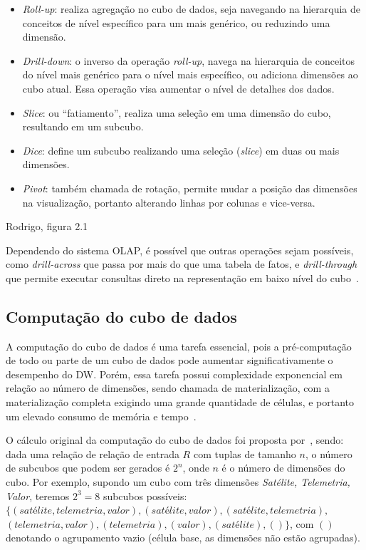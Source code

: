 \begin{itemize}
	\item \textit{Roll-up}: realiza agregação no cubo de dados, seja navegando na hierarquia de conceitos de nível específico para um mais genérico, ou reduzindo uma dimensão.
	\item \textit{Drill-down}: o inverso da operação \textit{roll-up}, navega na hierarquia de conceitos do nível mais genérico para o nível mais específico, ou adiciona dimensões ao cubo atual.
Essa operação visa aumentar o nível de detalhes dos dados.
	\item \textit{Slice}: ou ``fatiamento'', realiza uma seleção em uma dimensão do cubo, resultando em um subcubo.
	\item \textit{Dice}: define um subcubo realizando uma seleção (\textit{slice}) em duas ou mais dimensões.
	\item \textit{Pivot}: também chamada de rotação, permite mudar a posição das dimensões na visualização, portanto alterando linhas por colunas e vice-versa.
\end{itemize}

{\color{red} Rodrigo, figura 2.1}

Dependendo do sistema OLAP, é possível que outras operações sejam possíveis, como \textit{drill-across} que passa por mais do que uma tabela de fatos, e \textit{drill-through} que permite executar consultas direto na representação em baixo nível do cubo~\cite{hanDataMiningConcepts2011}.

\subsection{Computação do cubo de dados}\label{ch:fun:cube:comp}

A computação do cubo de dados é uma tarefa essencial, pois a pré-computação de todo ou parte de um cubo de dados pode aumentar significativamente o desempenho do DW.
Porém, essa tarefa possui complexidade exponencial em relação ao número de dimensões, sendo chamada de materialização, com a materialização completa exigindo uma grande quantidade de células, e portanto um elevado consumo de memória e tempo~\cite{hanDataMiningConcepts2011}.

O cálculo original da computação do cubo de dados foi proposta por~\cite{grayDataCubeRelational1996}, sendo: dada uma relação de relação de entrada $R$ com tuplas de tamanho $n$, o número de subcubos que podem ser gerados é $2^n$, onde $n$ é o número de dimensões do cubo.
Por exemplo, supondo um cubo com três dimensões \textit{Satélite, Telemetria, Valor}, teremos $2^3 = 8$ subcubos possíveis: $\{(satélite, telemetria, valor), (satélite, valor), (satélite, telemetria),$ $(telemetria, valor), (telemetria), (valor), (satélite), () \}$, com $()$ denotando o agrupamento vazio (célula base, as dimensões não estão agrupadas).

